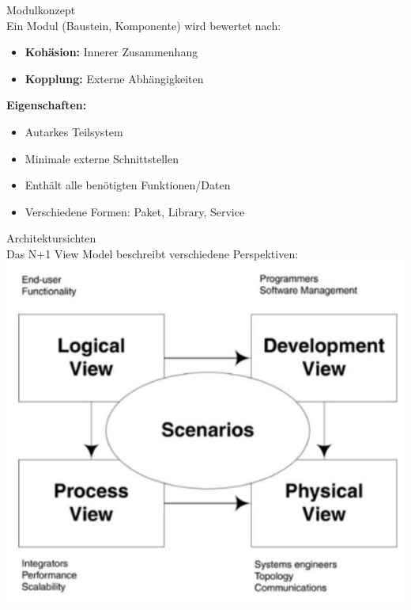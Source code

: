 \begin{concept}{Modulkonzept}\\
Ein Modul (Baustein, Komponente) wird bewertet nach:
\begin{itemize}
    \item \textbf{Kohäsion:} Innerer Zusammenhang
    \item \textbf{Kopplung:} Externe Abhängigkeiten
\end{itemize}

\textbf{Eigenschaften:}
\begin{itemize}
    \item Autarkes Teilsystem
    \item Minimale externe Schnittstellen
    \item Enthält alle benötigten Funktionen/Daten
    \item Verschiedene Formen: Paket, Library, Service
\end{itemize}
\end{concept}

\begin{concept}{Architektursichten}\\
Das N+1 View Model beschreibt verschiedene Perspektiven:\\
\includegraphics[width=0.9\linewidth]{images/2024_12_29_0d1d7b5551ea1b4b41bdg-09}
\end{concept}

